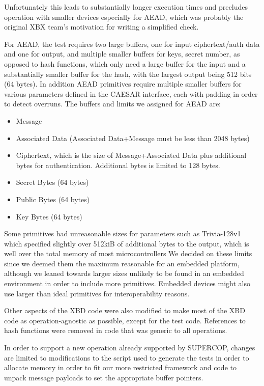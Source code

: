 \documentclass[twoside,11pt]{cergdoc}
\begin{document}
Unfortunately this leads to substantially longer
execution times and precludes operation with smaller devices especially for
AEAD, which was probably the original XBX team's motivation for writing a
simplified check. 

For AEAD, the test requires two large buffers, one for input ciphertext/auth data and
one for output, and multiple smaller buffers for keys, secret number,  as
opposed to hash functions, which only need a large buffer for the input and a
substantially smaller buffer for the hash, with the largest output being 512
bits (64 bytes). In addition AEAD primitives require
multiple smaller buffers for various parameters defined in the CAESAR interface,
each with padding in order to detect overruns. The buffers and limits we
assigned for AEAD are:
\begin{itemize}
    \item Message
    \item Associated Data (Associated Data+Message must be less than 2048 bytes)
    \item Ciphertext, which is the size of Message+Associated Data plus additional bytes for
        authentication. Additional bytes is limited to 128 bytes.
    \item Secret Bytes (64 bytes)
    \item Public Bytes (64 bytes) 
    \item Key Bytes (64 bytes)
\end{itemize}

Some primitives had unreasonable sizes for parameters such as Trivia-128v1 which
specified slightly over 512kiB of additional bytes to the output, which is well
over the total memory of most microcontrollers We decided on these limits since
we deemed them the maximum reasonable for an embedded platform, although we
leaned towards larger sizes unlikely to be found in an embedded environment in
order to include more primitives. Embedded devices might also use larger than
ideal primitives for interoperability reasons.

Other aspects of the XBD code were also modified to make most of the XBD code as
operation-agnostic as possible, except for the test code. References to hash
functions were removed in code that was generic to all operations. 

In order to support a new operation already supported by SUPERCOP, changes are
limited to modifications to the script used to generate the tests in order to
allocate memory in order to fit our more restricted framework and code to unpack
message payloads to set the appropriate buffer pointers.
\end{document}
